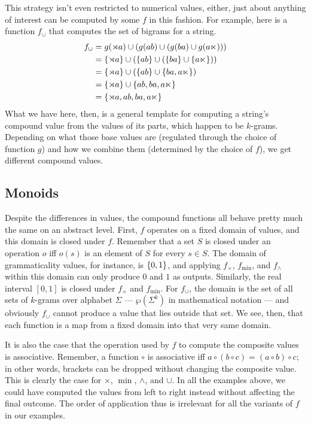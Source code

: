 This strategy isn't even restricted to numerical values, either, just about anything of interest can be computed by some $f$ in this fashion.
For example, here is a function $f_\cup$ that computes the set of bigrams for a string.
%
\begin{align*}
    f_\cup
    &= g(\rtimes a) \cup (g(ab) \cup (g(ba) \cup g(a\ltimes)))\\
    &= \left \{ \rtimes a \right \} \cup (\left \{ ab \right \} \cup (\left \{ ba \right \} \cup \left \{ a\ltimes \right \}))\\
    &= \left \{ \rtimes a \right \} \cup (\left \{ ab \right \} \cup \left \{ ba, a\ltimes \right \})\\
    &= \left \{ \rtimes a \right \} \cup \left \{ ab, ba, a\ltimes \right \}\\
    &= \left \{ \rtimes a, ab, ba, a\ltimes \right \}
\end{align*}
%
What we have here, then, is a general template for computing a string's compound value from the values of its parts, which happen to be $k$-grams.
Depending on what those base values are (regulated through the choice of function $g$) and how we combine them (determined by the choice of $f$), we get different compound values.

\subsection{Monoids}

Despite the differences in values, the compound functions all behave pretty much the same on an abstract level.
First, $f$ operates on a fixed domain of values, and this domain is closed under $f$.
Remember that a set $S$ is closed under an operation $o$ iff $o(s)$ is an element of $S$ for every $s \in S$.
The domain of grammaticality values, for instance, is $\left \{ 0,1 \right \}$, and applying $f_\times$, $f_{\mathrel{\text{min}}}$, and $f_\wedge$ within this domain can only produce $0$ and $1$ as outputs.
Similarly, the real interval $[0,1]$ is closed under $f_\times$ and $f_{\mathrel{\text{min}}}$.
For $f_\cup$, the domain is the set of all sets of $k$-grams over alphabet $\Sigma$ --- $\wp(\Sigma^k)$ in mathematical notation --- and obviously $f_\cup$ cannot produce a value that lies outside that set.
We see, then, that each function is a map from a fixed domain into that very same domain.

It is also the case that the operation used by $f$ to compute the composite values is associative.
Remember, a function $\circ$ is associative iff $a \circ (b \circ c) = (a \circ b) \circ c$; in other words, brackets can be dropped without changing the composite value.
This is clearly the case for $\times$, $\mathrel{\text{min}}$, $\wedge$, and $\cup$.
In all the examples above, we could have computed the values from left to right instead without affecting the final outcome.
The order of application thus is irrelevant for all the variants of $f$ in our examples.

